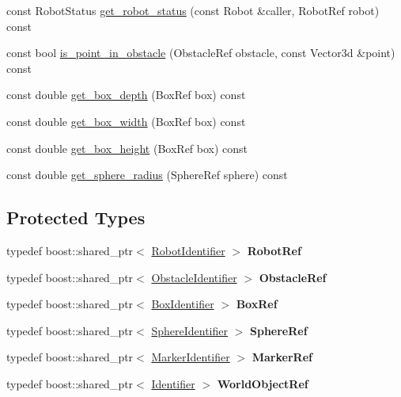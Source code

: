 \begin{CompactItemize}
const RobotStatus \hyperlink{class_view_9afafa253b161a72d9d1fa727b652fef}{get\_\-robot\_\-status} (const Robot \&caller, RobotRef robot) const 
\item 
const bool \hyperlink{class_view_4fe93f018f5b3fc812f30e6b0d91c9e6}{is\_\-point\_\-in\_\-obstacle} (ObstacleRef obstacle, const Vector3d \&point) const 
\item 
const double \hyperlink{class_view_87dbec1e6f6add8364f7f73262004088}{get\_\-box\_\-depth} (BoxRef box) const 
\item 
const double \hyperlink{class_view_4dd52be2f5f895efa82622a0e03057f7}{get\_\-box\_\-width} (BoxRef box) const 
\item 
const double \hyperlink{class_view_7b70e3c95c8b45e03230c84b46243cf3}{get\_\-box\_\-height} (BoxRef box) const 
\item 
const double \hyperlink{class_view_b7aa87fa394fbcd9a84e288dd89b36ee}{get\_\-sphere\_\-radius} (SphereRef sphere) const 
\end{CompactItemize}
\subsection*{Protected Types}
\begin{CompactItemize}
\item 
\hypertarget{class_view_680280f66593fcb79cfb5e3f7106870a}{
typedef boost::shared\_\-ptr$<$ \hyperlink{class_robot_identifier}{RobotIdentifier} $>$ \textbf{RobotRef}}
\label{class_view_680280f66593fcb79cfb5e3f7106870a}

\item 
\hypertarget{class_view_b6d68b48711c9c88ac387dab7a0dc522}{
typedef boost::shared\_\-ptr$<$ \hyperlink{class_obstacle_identifier}{ObstacleIdentifier} $>$ \textbf{ObstacleRef}}
\label{class_view_b6d68b48711c9c88ac387dab7a0dc522}

\item 
\hypertarget{class_view_182d3f5872b9dd21a5da8ed81841bec6}{
typedef boost::shared\_\-ptr$<$ \hyperlink{class_box_identifier}{BoxIdentifier} $>$ \textbf{BoxRef}}
\label{class_view_182d3f5872b9dd21a5da8ed81841bec6}

\item 
\hypertarget{class_view_c2a199ef4c72c93c73a5b47fc1de419d}{
typedef boost::shared\_\-ptr$<$ \hyperlink{class_sphere_identifier}{SphereIdentifier} $>$ \textbf{SphereRef}}
\label{class_view_c2a199ef4c72c93c73a5b47fc1de419d}

\item 
\hypertarget{class_view_b697adfcdd10edf1b8b015b1138f3233}{
typedef boost::shared\_\-ptr$<$ \hyperlink{class_marker_identifier}{MarkerIdentifier} $>$ \textbf{MarkerRef}}
\label{class_view_b697adfcdd10edf1b8b015b1138f3233}

\item 
\hypertarget{class_view_e633afa80f7c3c606f0e2b2913726101}{
typedef boost::shared\_\-ptr$<$ \hyperlink{class_identifier}{Identifier} $>$ \textbf{WorldObjectRef}}
\label{class_view_e633afa80f7c3c606f0e2b2913726101}

\end{CompactItemize}
